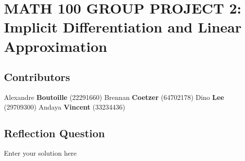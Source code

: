 \documentclass[answers,addpoints]{exam}
\begin{document}
\section*{MATH 100 GROUP PROJECT 2: \\Implicit Differentiation and Linear Approximation}

\normalsize

\subsection*{Contributors}

Alexandre \textbf{Boutoille} (22291660) Brennan \textbf{Coetzer} (64702178) Dino \textbf{Lee} (29709300) Andaya \textbf{Vincent} (33234436)

\hrulefill

\subsection*{Reflection Question}

\begin{solution}
  Enter your solution here
\end{solution}

\hrulefill

\newpage

\end{document}
